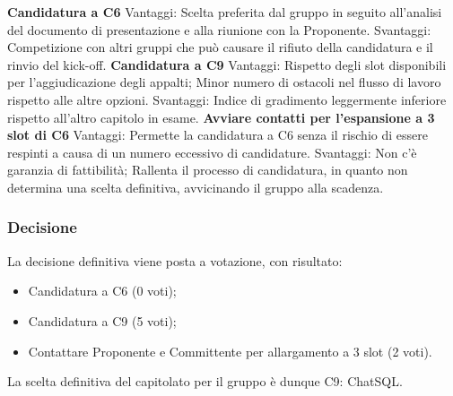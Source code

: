 \begin{outline}
	\1 \textbf{Candidatura a C6}
		\2 Vantaggi:
			\3 Scelta preferita dal gruppo in seguito all’analisi del documento di presentazione e alla riunione con la Proponente.
		\2 Svantaggi:
			\3 Competizione con altri gruppi che può causare il rifiuto della candidatura e il rinvio del kick-off.
	\1 \textbf{Candidatura a C9}
		\2 Vantaggi:
			\3 Rispetto degli slot disponibili per l’aggiudicazione degli appalti;
			\3 Minor numero di ostacoli nel flusso di lavoro rispetto alle altre opzioni. 
		\2 Svantaggi:
			\3 Indice di gradimento leggermente inferiore rispetto all'altro capitolo in esame.
	\1 \textbf{Avviare contatti per l'espansione a 3 slot di C6}
		\2 Vantaggi:
			\3 Permette la candidatura a C6 senza il rischio di essere respinti a causa di un numero eccessivo di candidature.
		\2 Svantaggi:
			\3 Non c’è garanzia di fattibilità;
			\3 Rallenta il processo di candidatura, in quanto non determina una scelta definitiva, avvicinando il gruppo alla scadenza.
\end{outline}
\subsubsection{Decisione}
La decisione definitiva viene posta a votazione, con risultato:
\begin{itemize}
	\item Candidatura a C6 (0 voti);
	\item Candidatura a C9 (5 voti);
	\item Contattare Proponente e Committente per allargamento a 3 slot (2 voti).
\end{itemize}
La scelta definitiva del capitolato per il gruppo è dunque C9: ChatSQL.